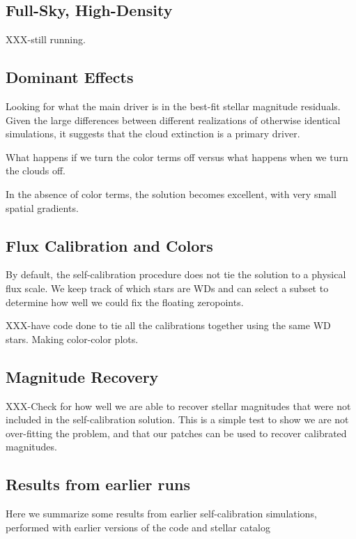 \documentclass[12pt,preprint]{aastex}
\begin{document}
\subsection{Full-Sky, High-Density}

XXX-still running.


\subsection{Dominant Effects}

Looking for what the main driver is in the best-fit stellar magnitude residuals.  Given the large differences between different realizations of otherwise identical simulations, it suggests that the cloud extinction is a primary driver.  

What happens if we turn the color terms off versus what happens when we turn the clouds off.  

In the absence of color terms, the solution becomes excellent, with very small spatial gradients.  

\subsection{Flux Calibration and Colors}\label{sec:fluxcal}

By default, the self-calibration procedure does not tie the solution to a physical flux scale.  We keep track of which stars are WDs and can select a subset to determine how well we could fix the floating zeropoints.

XXX-have code done to tie all the calibrations together using the same WD stars.  Making color-color plots.

\subsection{Magnitude Recovery}

XXX-Check for how well we are able to recover stellar magnitudes that were not included in the self-calibration solution.  This is a simple test to show we are not over-fitting the problem, and that our patches can be used to recover calibrated magnitudes.

\subsection{Results from earlier runs}
Here we summarize some results from earlier self-calibration simulations, performed with earlier versions of the code and stellar catalog
\end{document}

